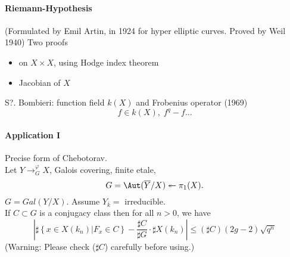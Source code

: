 \paragraph{Riemann-Hypothesis} (Formulated by Emil Artin, in 1924 for hyper elliptic curves. Proved by Weil 1940) Two proofs
	\begin{itemize}
	\item on $X\times X$, using Hodge index theorem
	\item Jacobian of $X$
	\end{itemize}
S?. Bombieri: function field $k(X)$ and Frobenius operator (1969)
	$$f\in k(X), \; f^q-f...$$

\paragraph{Application I} Precise form of Chebotorav.\\
Let $Y\to^\varphi_G X$, Galois covering, finite etale, 
	$$G = \Aut(\overline Y/X)\twoheadleftarrow \pi_1(X).$$
	$G=Gal(Y/X)$. 
	Assume $Y_{\overline k} = $ irreducible. \\
If $C\subset G$ is a conjugacy class then for all $n>0$, we have
	$$\left|\sharp\left\{x\in X(k_n)\left|F_x\in C\right.\right\}-\frac{\sharp C}{\sharp G}\cdot\sharp X(k_n)\right|\leq (\sharp C)(2g-2)\sqrt{q^n}$$
	(Warning: Please check ($\sharp C$) carefully before using.)\\
	
